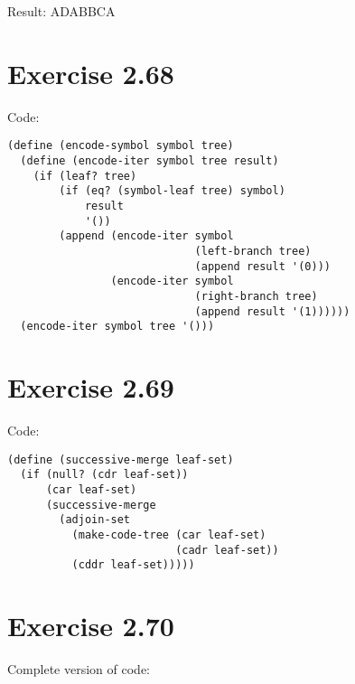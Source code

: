 \documentclass[../main.tex]{subfiles}
\begin{document}
Result: ADABBCA

\section{Exercise 2.68}

Code:

\begin{lstlisting}
(define (encode-symbol symbol tree)
  (define (encode-iter symbol tree result)
    (if (leaf? tree)
        (if (eq? (symbol-leaf tree) symbol)
            result
            '())
        (append (encode-iter symbol
                             (left-branch tree)
                             (append result '(0)))
                (encode-iter symbol
                             (right-branch tree)
                             (append result '(1))))))
  (encode-iter symbol tree '()))
\end{lstlisting}

\section{Exercise 2.69}

Code:

\begin{lstlisting}
(define (successive-merge leaf-set)
  (if (null? (cdr leaf-set))
      (car leaf-set)
      (successive-merge
        (adjoin-set
          (make-code-tree (car leaf-set)
                          (cadr leaf-set))
          (cddr leaf-set)))))
\end{lstlisting}

\section{Exercise 2.70}

Complete version of code:
\end{document}
